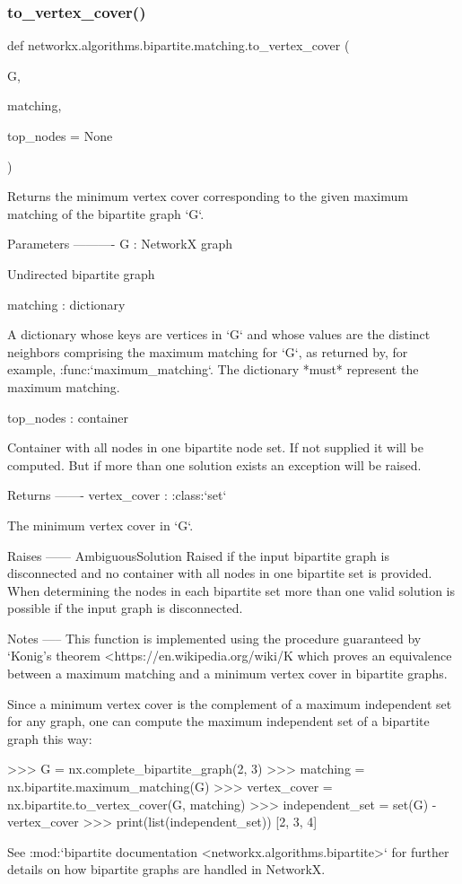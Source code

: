 \subsubsection{\texorpdfstring{to\+\_\+vertex\+\_\+cover()}{to\_vertex\_cover()}}
{\footnotesize\ttfamily def networkx.\+algorithms.\+bipartite.\+matching.\+to\+\_\+vertex\+\_\+cover (\begin{DoxyParamCaption}\item[{}]{G,  }\item[{}]{matching,  }\item[{}]{top\+\_\+nodes = {\ttfamily None} }\end{DoxyParamCaption})}

\begin{DoxyVerb}Returns the minimum vertex cover corresponding to the given maximum
matching of the bipartite graph `G`.

Parameters
----------
G : NetworkX graph

  Undirected bipartite graph

matching : dictionary

  A dictionary whose keys are vertices in `G` and whose values are the
  distinct neighbors comprising the maximum matching for `G`, as returned
  by, for example, :func:`maximum_matching`. The dictionary *must*
  represent the maximum matching.

top_nodes : container

  Container with all nodes in one bipartite node set. If not supplied
  it will be computed. But if more than one solution exists an exception
  will be raised.

Returns
-------
vertex_cover : :class:`set`

  The minimum vertex cover in `G`.

Raises
------
AmbiguousSolution
  Raised if the input bipartite graph is disconnected and no container
  with all nodes in one bipartite set is provided. When determining
  the nodes in each bipartite set more than one valid solution is
  possible if the input graph is disconnected.

Notes
-----
This function is implemented using the procedure guaranteed by `Konig's
theorem
<https://en.wikipedia.org/wiki/K%
which proves an equivalence between a maximum matching and a minimum vertex
cover in bipartite graphs.

Since a minimum vertex cover is the complement of a maximum independent set
for any graph, one can compute the maximum independent set of a bipartite
graph this way:

>>> G = nx.complete_bipartite_graph(2, 3)
>>> matching = nx.bipartite.maximum_matching(G)
>>> vertex_cover = nx.bipartite.to_vertex_cover(G, matching)
>>> independent_set = set(G) - vertex_cover
>>> print(list(independent_set))
[2, 3, 4]

See :mod:`bipartite documentation <networkx.algorithms.bipartite>`
for further details on how bipartite graphs are handled in NetworkX.\end{DoxyVerb}
 

